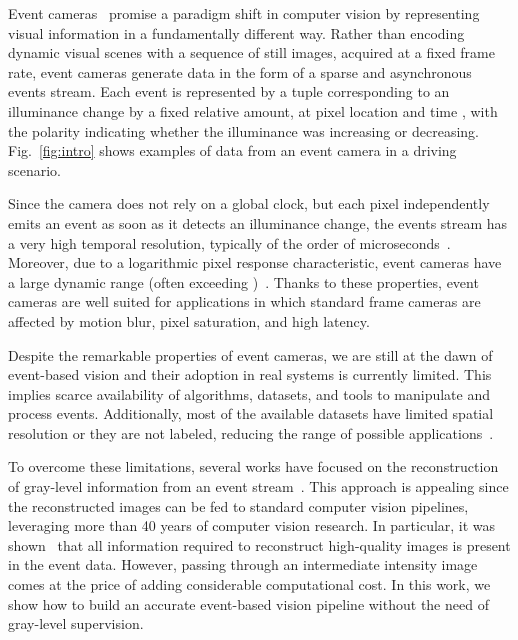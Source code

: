 \documentclass{article}
\begin{document}
Event cameras~\cite{Lichtsteiner2008,posch2014retinomorphic,son20174,finateu20205} promise a paradigm shift in computer vision by
representing visual information in a fundamentally different way. 
Rather than encoding dynamic visual scenes with a sequence of still images, acquired at a fixed frame rate,
event cameras generate data in the form of a sparse and asynchronous events stream. 
Each event is represented by a tuple  corresponding to an illuminance 
change by a fixed relative amount, at pixel location  and time , with the polarity  indicating whether the illuminance was increasing or decreasing. Fig.~\ref{fig:intro} shows examples of data from an event camera in a driving scenario.

Since the camera does not rely on a global clock, 
but each pixel independently emits 
an event as soon as it detects an illuminance change,
the events stream has a very high temporal resolution, 
typically of the order of microseconds~\cite{Lichtsteiner2008}.
Moreover, due to a logarithmic pixel response characteristic, event cameras have a large dynamic range (often exceeding )~\cite{finateu20205}.
Thanks to these properties, event cameras are well suited for applications in which standard frame cameras are affected by
motion blur, pixel saturation, and high latency. 


Despite the remarkable properties of event cameras,
we are still at the dawn of event-based vision and 
their adoption in real systems is currently limited.
This implies scarce availability of algorithms, 
datasets, and tools to manipulate and process events.
Additionally, 
most of the available datasets have 
limited spatial resolution or they are not labeled, 
reducing the range of possible applications~\cite{de2020large,gallego2019event}.

To overcome these limitations, several works have focused on the reconstruction of gray-level information from an event stream~\cite{kim2008simultaneous,bardow2016simultaneous,munda2018real,rebecq2019high}. This approach is appealing since the reconstructed images can be fed to standard computer vision pipelines, leveraging more than 40 years of computer vision research.
In particular, it was shown~\cite{rebecq2019high} that all information required to reconstruct high-quality images is present in the event data.
However, passing through an intermediate intensity image comes at the price of adding considerable computational cost.
In this work, we show how to build an accurate event-based vision pipeline without the need of gray-level supervision.
\end{document}

